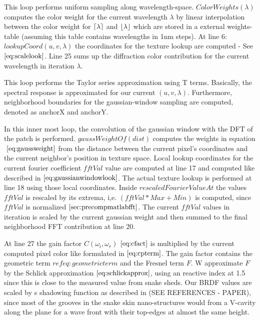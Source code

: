 This loop performs uniform sampling along wavelength-space. $ColorWeights(\lambda)$ computes the color weight for the current wavelength $\lambda$ by linear interpolation between the color weight for $\lceil\lambda\rceil$ and $\lfloor\lambda\rfloor$ which are stored in a external weights-table (assuming this table contains wavelengths in 1nm steps). At line 6: $lookupCoord(u, v, \lambda)$ the coordinates for the texture lookup are computed - See $\ref{eq:scalelook}$. Line 25 sums up the diffraction color contribution for the current wavelength in iteration $\lambda$.  

This loop performs the Taylor series approximation using T terms. Basically, the spectral response is approximated for our current $(u,v,\lambda)$. Furthermore, neighborhood boundaries for the gaussian-window sampling are computed, denoted as anchorX and anchorY.

In this inner most loop, the convolution of the gaussian window with the DFT of the patch is performed. $gaussWeightOf(dist)$ computes the weights in equation $~\eqref{eq:gaussweight}$ from the distance between the current pixel's coordinates and the current neighbor's position in texture space. Local lookup coordinates for the current fourier coefficient $fftVal$ value are computed at line 17 and computed like described in $\ref{eq:gaussianwindowlook}$. The actual texture lookup is performed at line 18 using those local coordinates. Inside $rescaledFourierValueAt$ the values $fftVal$ is rescaled by its extrema, i,e. $(fftVal*Max + Min)$ is computed, since $fftVal$ is normalized $\ref{sec:precompmatlabfft}$. The current $fftVal$ values in iteration is scaled by the current gaussian weight and then summed to the final neighborhood FFT contribution at line 20.

At line 27 the gain factor $C(\omega_i, \omega_r)$  $\ref{eq:cfact}$ is multiplied by the current computed pixel color like formulated in $\ref{eq:cpterm}$. The gain factor contains the geometric term $ref{eq:geometricterm}$ and the Fresnel term $F$. W approximate $F$ by the Schlick approximation $\ref{eq:schlickapprox}$, using an reactive index at 1.5 since this is close to the measured value from snake sheds.
Our BRDF values are scaled by s shadowing function as described in (SEE REFERENCES - PAPER), since most of the grooves in the snake skin nano-structures would from a V-cavity along the plane for a wave front with their top-edges at almost the same height.

